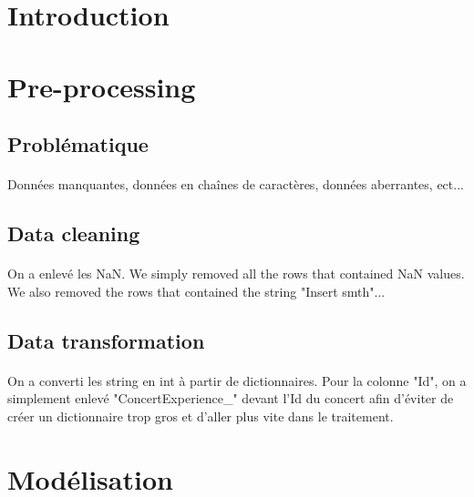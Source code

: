 \documentclass[11pt,a4paper]{article}
\begin{document}


\pagestyle{fancy}


\newpage

\section{Introduction}

\section{Pre-processing}

\subsection{Problématique}

\paragraph{} Données manquantes, données en chaînes de caractères, données aberrantes, ect...

\subsection{Data cleaning}

\paragraph{} On a enlevé les NaN. We simply removed all the rows that contained NaN values. We also removed the rows that contained the string "Insert smth"...

\subsection{Data transformation}

\paragraph{} On a converti les string en int à partir de dictionnaires. Pour la colonne "Id", on a simplement enlevé "ConcertExperience\_" devant l'Id du concert afin d'éviter de créer un dictionnaire trop gros et d'aller plus vite dans le traitement.

\section{Modélisation}
\end{document}

